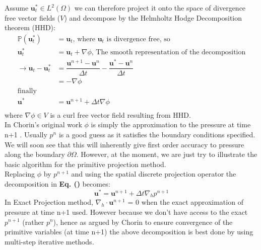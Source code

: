 Assume $\textbf{u}^*_t \in \textit{L}^2 (\Omega)$ we can therefore project it onto the space of divergence free vector fields ($\textit{V}$) and decompose by the Helmholtz Hodge Decomposition theorem (HHD):
\begin{equation}
\begin{aligned}
\mathbb{P} (\textbf{u}^*_t) &= \textbf{u}_t, \, \text{where $\textbf{u}_t$ is divergence free, so} \\
\textbf{u}^*_t &= \textbf{u}_t + \nabla \textit{$\phi$}, \, \text{The smooth representation of the decomposition} \\
\rightarrow \textbf{u}_t - \textbf{u}^*_t &= \dfrac{\textbf{u}^{n+1} - \textbf{u}^n}{\Delta t} - \dfrac{\textbf{u}^* - \textbf{u}^n}{\Delta t} \\
&= -\nabla \textit{$\phi$} \\
\text{finally} \\
\textbf{u}^* &= \textbf{u}^{n+1} + \Delta t \nabla \textit{$\phi$} \\
\end{aligned}
\end{equation}
where $\nabla \phi \in \textit{V}$ is a curl free vector field resulting from HHD.\\

In Chorin's original work $\phi$ is simply the approximation to the pressure at time n+1 \cite{chorin1968numerical}. Usually $\textit{p}^n$ is a good guess as it satisfies the boundary conditions specified. We will soon see that this will inherently give first order accuracy to pressure along the boundary $\partial \Omega$. However, at the moment, we are just try to illustrate the basic algorithm for the primitive projection method.\\
Replacing $\phi$ by $\textit{p}^{n+1}$ and using the spatial discrete projection operator the decomposition in \textbf{Eq. ()} becomes:
\begin{equation}
\textbf{u}^* = \textbf{u}^{n+1} + \Delta t \nabla_h \textit{p}^{n+1}
\end{equation}
In Exact Projection method, $\nabla_h \cdot \textbf{u}^{n+1}$ = 0 when the exact approximation of pressure at time n+1 used. However because we don't have access to the exact $\textit{p}^{n+1}$ (rather $\textit{p}^n$), hence as argued by Chorin \cite{chorin1968numerical} to ensure convergence of the primitive variables (at time n+1) the above decomposition is best done by using multi-step iterative methods.\\

